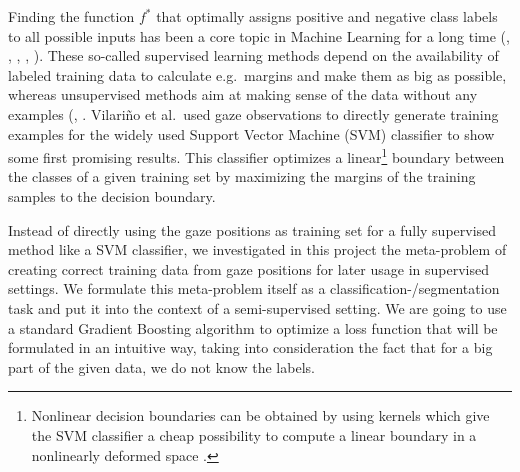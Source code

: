 Finding the function $f^*$ that optimally assigns positive and negative class labels to all possible inputs has been a core topic in Machine Learning for a long time (\cite{cover1967nearest}, \cite{cox1958regression}, \cite{russell1995modern}, \cite{cortes1995support}, \cite{freund1997decision}). 
These so-called supervised learning methods depend on the availability of labeled training data to calculate e.g.\ margins and make them as big as possible, whereas unsupervised methods aim at making sense of the data without any examples (\cite{macqueen1967some}, \cite{cheng1995mean}. 
Vilari\~no et al.\ used gaze observations to directly generate training examples for the widely used Support Vector Machine (SVM) classifier \cite{cortes1995support} to show some first promising results. 
This classifier optimizes a linear\footnote{Nonlinear decision boundaries can be obtained by using kernels which give the SVM classifier a cheap possibility to compute a linear boundary in a nonlinearly deformed space \cite{boser1992training}.} boundary between the classes of a given training set by maximizing the margins of the training samples to the decision boundary. 

Instead of directly using the gaze positions as training set for a fully supervised method like a SVM classifier, we investigated in this project the meta-problem of creating correct training data from gaze positions for later usage in supervised settings. 
We formulate this meta-problem itself as a classification-/segmentation task and put it into the context of a semi-supervised setting. 
We are going to use a standard Gradient Boosting algorithm to optimize a loss function that will be formulated in an intuitive way, taking into consideration the fact that for a big part of the given data, we do not know the labels.

